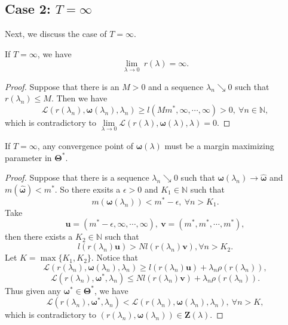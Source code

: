 \subsection{Case 2: $T=\infty$}
Next, we discuss the case of $T=\infty$.

\begin{lemma}\label{Maxmargin7}
	If $T = \infty$, we have
	\begin{equation}
	\lim\limits_{\lambda\rightarrow 0}\ r(\lambda) = \infty.
	\end{equation}
\end{lemma}

\begin{proof}
	Suppose that there is an $M>0$ and a sequence $\lambda_n \searrow 0$ such that  $r(\lambda_n) \leq M$. Then we have
	\[
	\mathcal{L}(r(\lambda_n),\bm\omega(\lambda_n),\lambda_n) \geq l(Mm^*,\infty,\cdots,\infty) > 0,\ \forall n\in\mathbb{N},
	\]
	which is contradictory to $\lim\limits_{\lambda\rightarrow 0} \mathcal L(r(\lambda),\bm\omega(\lambda),\lambda) = 0$.
\end{proof}


\begin{theorem}
	If $T = \infty$, any convergence point of $\bm\omega(\lambda)$ must be a margin maximizing parameter in $\bm\Theta^*$.
\end{theorem}

\begin{proof}
	Suppose that there is a sequence $\lambda_n \searrow 0$ such that  $\bm\omega(\lambda_n)\rightarrow \widehat{\bm\omega}$ and $m(\widehat{\bm\omega})< m^*$. So there exsits a $\epsilon>0$ and $K_1\in \mathbb{N}$ such that
	\[
	m(\bm\omega(\lambda_n)) < m^* - \epsilon, \ \forall n>K_1.
	\]
	Take
	\[
	\bm u = (m^*-\epsilon,\infty,\cdots,\infty),\ \bm v = (m^*, m^*,\cdots,m^*),
	\]
	then there exists a $K_2\in\mathbb{N}$ such that
	\[
	l(r(\lambda_n) \bm u) > N l(r(\lambda_n) \bm v), \forall n>K_2.
	\]
	Let $K = \max\{K_1,K_2\}$. Notice that
	\[
	\mathcal{L}(r(\lambda_n),\bm\omega(\lambda_n),\lambda_n) \geq  l(r(\lambda_n)\bm u) + \lambda_n \rho(r(\lambda_n)),
	\]
	\[
	\mathcal{L}(r(\lambda_n),\bm\omega^*,\lambda_n) \leq N l(r(\lambda_n) \bm v) + \lambda_n \rho(r(\lambda_n)).
	\]
	Thus given any $\bm\omega^*\in \bm\Theta^*$, we have
	\[
	\mathcal{L}(r(\lambda_n),\bm\omega^*,\lambda_n) < \mathcal{L}(r(\lambda_n),\bm\omega(\lambda_n),\lambda_n),\ \forall n > K,
	\]
	which is contradictory to $(r(\lambda_n),\bm\omega(\lambda_n))\in \bm Z(\lambda)$.
\end{proof}

